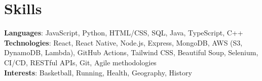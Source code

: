 \documentclass[letterpaper,11pt]{article}
\begin{document}
\section{Skills}
\begin{itemize}[leftmargin=0.15in, label={}]
   \footnotesize{\item{
    \textbf{Languages}{: JavaScript, Python, HTML/CSS, SQL, Java, TypeScript, C++} \\
    \textbf{Technologies}{: React, React Native, Node.js, Express, MongoDB, AWS (S3, DynamoDB, Lambda), GitHub Actions, Tailwind CSS, Beautiful Soup, Selenium, CI/CD, RESTful APIs, Git, Agile methodologies} \\
    \textbf{Interests}{: Basketball, Running, Health, Geography, History}
   }}
\end{itemize}
\end{document}
